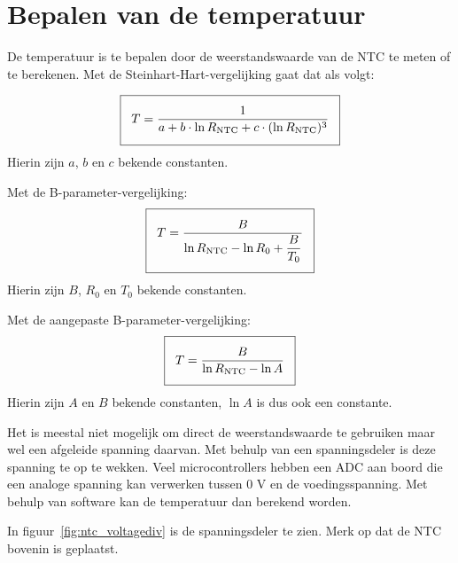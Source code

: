\documentclass[12pt,a4paper,final,twoside,fleqn]{article}
\newcommand{\rntc}{R_\text{NTC}}
\begin{document}
\section{Bepalen van de temperatuur}
De temperatuur is te bepalen door de weerstandswaarde van de NTC te meten of te
berekenen. Met de Steinhart-Hart-vergelijking gaat dat als volgt:

\begin{equation}
\label{equ:invertedsteinharthart}
\setlength\fboxsep{2ex}
\boxed{T = \dfrac{1}{a + b\cdot\ln \rntc + c\cdot( \ln \rntc )^3}}
\end{equation}
Hierin zijn $a$, $b$ en $c$ bekende constanten.

Met de B-parameter-vergelijking:
\begin{equation}
\label{equ:invertedsteinharthartsimpl}
\setlength\fboxsep{2ex}
\boxed{T = \dfrac{B}{\ln \rntc - \ln R_0 + \dfrac{B}{T_0}}}
\end{equation}
Hierin zijn $B$, $R_0$ en $T_0$ bekende constanten.


Met de aangepaste B-parameter-vergelijking:
\begin{equation}
\label{equ:invertedsteinharthartadapt}
\setlength\fboxsep{2ex}
\boxed{T = \dfrac{B}{\ln \rntc - \ln A}}
\end{equation}
Hierin zijn $A$ en $B$ bekende constanten, $\ln A$ is dus ook een constante.

Het is meestal niet mogelijk om direct de weerstandswaarde te gebruiken maar
wel een afgeleide spanning daarvan. Met behulp van een spanningsdeler is deze
spanning te op te wekken. Veel microcontrollers hebben een ADC aan boord die
een analoge spanning kan verwerken tussen 0 V en de voedingsspanning. Met
behulp van software kan de temperatuur dan berekend worden.

In figuur~\ref{fig:ntc_voltagediv} is de spanningsdeler te zien. Merk op dat
de NTC bovenin is geplaatst.
\end{document}
